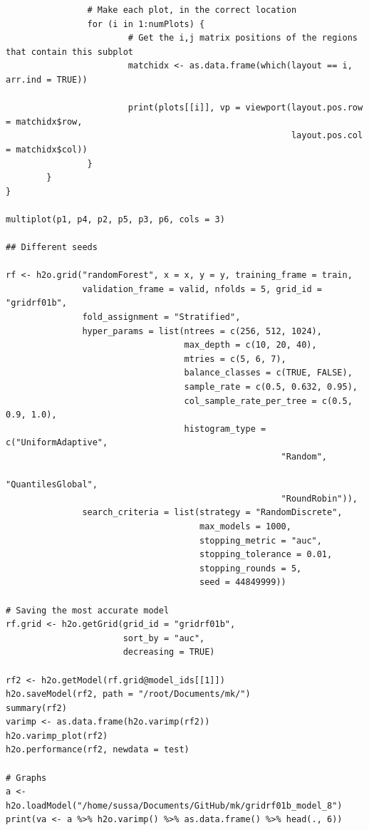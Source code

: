 \documentclass[a4paper,12pt]{article}
\begin{document}
\begin{verbatim}
                # Make each plot, in the correct location
                for (i in 1:numPlots) {
                        # Get the i,j matrix positions of the regions that contain this subplot
                        matchidx <- as.data.frame(which(layout == i, arr.ind = TRUE))
                        
                        print(plots[[i]], vp = viewport(layout.pos.row = matchidx$row,
                                                        layout.pos.col = matchidx$col))
                }
        }
}

multiplot(p1, p4, p2, p5, p3, p6, cols = 3)

## Different seeds

rf <- h2o.grid("randomForest", x = x, y = y, training_frame = train, 
               validation_frame = valid, nfolds = 5, grid_id = "gridrf01b",
               fold_assignment = "Stratified",
               hyper_params = list(ntrees = c(256, 512, 1024),
                                   max_depth = c(10, 20, 40),
                                   mtries = c(5, 6, 7),
                                   balance_classes = c(TRUE, FALSE),
                                   sample_rate = c(0.5, 0.632, 0.95),
                                   col_sample_rate_per_tree = c(0.5, 0.9, 1.0),
                                   histogram_type = c("UniformAdaptive",
                                                      "Random",
                                                      "QuantilesGlobal",
                                                      "RoundRobin")),
               search_criteria = list(strategy = "RandomDiscrete", 
                                      max_models = 1000, 
                                      stopping_metric = "auc", 
                                      stopping_tolerance = 0.01, 
                                      stopping_rounds = 5, 
                                      seed = 44849999)) 

# Saving the most accurate model
rf.grid <- h2o.getGrid(grid_id = "gridrf01b",
                       sort_by = "auc",
                       decreasing = TRUE)

rf2 <- h2o.getModel(rf.grid@model_ids[[1]])
h2o.saveModel(rf2, path = "/root/Documents/mk/")
summary(rf2)
varimp <- as.data.frame(h2o.varimp(rf2))
h2o.varimp_plot(rf2)
h2o.performance(rf2, newdata = test)

# Graphs
a <- h2o.loadModel("/home/sussa/Documents/GitHub/mk/gridrf01b_model_8")
print(va <- a %>% h2o.varimp() %>% as.data.frame() %>% head(., 6)) 


\end{verbatim}
\end{document}
